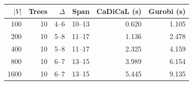 \begin{tabular}{rrrrrr}
\toprule
$|V|$ & Trees & $\Delta$ & Span & CaDiCaL (s) & Gurobi (s)\\
\midrule
100 & 10 & 4--6 & 10--13 & 0.620 & 1.105\\
200 & 10 & 5--8 & 11--17 & 1.136 & 2.478\\
400 & 10 & 5--8 & 11--17 & 2.325 & 4.159\\
800 & 10 & 6--7 & 13--15 & 3.989 & 6.154\\
1600 & 10 & 6--7 & 13--15 & 5.445 & 9.135\\
\bottomrule
\end{tabular}
